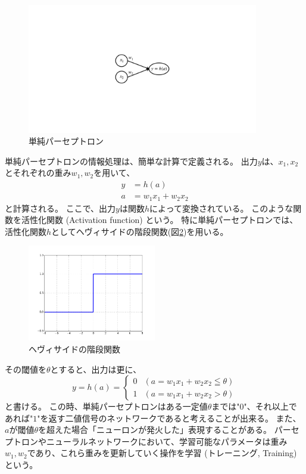 \begin{figure}[h]
 \centering
 \includegraphics[trim = 250 300 250 300, width=0.9\textwidth, clip]{Figure/2DeepLearning/2SimplePerceptron.png}
 \caption{単純パーセプトロン}
 \label{2SimplePerceptron}
\end{figure}

単純パーセプトロンの情報処理は、簡単な計算で定義される。
出力$y$は、$x_1,x_2$とそれぞれの重み$w_1,w_2$を用いて、
\begin{equation}
 \begin{split}
  y &= h(a)\\
  a &= w_1x_1 + w_2x_2
 \end{split}
\end{equation}
と計算される。
ここで、出力$y$は関数$h$によって変換されている。
このような関数を活性化関数 (Activation function) という。
特に単純パーセプトロンでは、活性化関数$h$としてヘヴィサイドの階段関数(図\ref{3HeavisideStepFunction})を用いる。

\begin{figure}[h]
 \centering
 \includegraphics[width=0.5\textwidth]{Figure/2DeepLearning/3HeavisideStepFunction.png}
 \caption{ヘヴィサイドの階段関数}
 \label{3HeavisideStepFunction}
\end{figure}

その閾値を$\theta$とすると、出力は更に、
\begin{equation}
 y = h(a) = \left\{ \begin{array}{ll}
    0 & (a = w_1x_1 + w_2x_2 \leqq \theta) \\
    1 & (a = w_1x_1 + w_2x_2 > \theta)
 \end{array} \right.
\end{equation}
と書ける。
この時、単純パーセプトロンはある一定値$\theta$までは"$0$"、それ以上であれば"$1$"を返す二値信号のネットワークであると考えることが出来る。
また、$a$が閾値$\theta$を超えた場合「ニューロンが発火した」表現することがある。
パーセプトロンやニューラルネットワークにおいて、学習可能なパラメータは重み$w_1,w_2$であり、これら重みを更新していく操作を学習 (トレーニング, Training) という。


